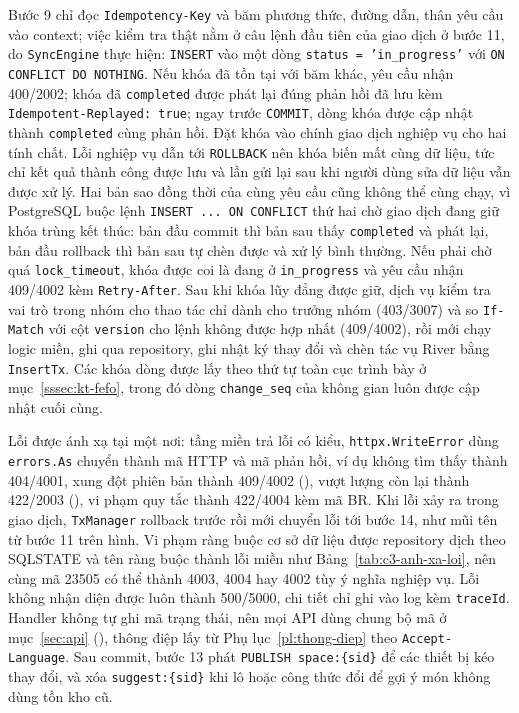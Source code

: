 Bước 9 chỉ đọc \texttt{Idempotency-Key} và băm phương thức, đường dẫn, thân yêu cầu vào context; việc kiểm tra thật nằm ở câu lệnh đầu tiên của giao dịch ở bước 11, do \texttt{SyncEngine} thực hiện: \texttt{INSERT} vào  một dòng \texttt{status = 'in\_progress'} với \texttt{ON CONFLICT DO NOTHING}. Nếu khóa đã tồn tại với băm khác, yêu cầu nhận 400/2002; khóa đã \texttt{completed} được phát lại đúng phản hồi đã lưu kèm \texttt{Idempotent-Replayed: true}; ngay trước \texttt{COMMIT}, dòng khóa được cập nhật thành \texttt{completed} cùng phản hồi. Đặt khóa vào chính giao dịch nghiệp vụ cho hai tính chất. Lỗi nghiệp vụ dẫn tới \texttt{ROLLBACK} nên khóa biến mất cùng dữ liệu, tức chỉ kết quả thành công được lưu và lần gửi lại sau khi người dùng sửa dữ liệu vẫn được xử lý. Hai bản sao đồng thời của cùng yêu cầu cũng không thể cùng chạy, vì PostgreSQL buộc lệnh \texttt{INSERT ... ON CONFLICT} thứ hai chờ giao dịch đang giữ khóa trùng kết thúc: bản đầu commit thì bản sau thấy \texttt{completed} và phát lại, bản đầu rollback thì bản sau tự chèn được và xử lý bình thường. Nếu phải chờ quá \texttt{lock\_timeout}, khóa được coi là đang ở \texttt{in\_progress} và yêu cầu nhận 409/4002 kèm \texttt{Retry-After}. Sau khi khóa lũy đẳng được giữ, dịch vụ kiểm tra vai trò trong nhóm cho thao tác chỉ dành cho trưởng nhóm (403/3007) và so \texttt{If-Match} với cột \texttt{version} cho lệnh không được hợp nhất (409/4002), rồi mới chạy logic miền, ghi qua repository, ghi nhật ký thay đổi và chèn tác vụ River bằng \texttt{InsertTx}. Các khóa dòng được lấy theo thứ tự toàn cục trình bày ở mục~\ref{sssec:kt-fefo}, trong đó dòng \texttt{change\_seq} của không gian luôn được cập nhật cuối cùng.

Lỗi được ánh xạ tại một nơi: tầng miền trả lỗi có kiểu, \texttt{httpx.WriteError} dùng \texttt{errors.As} chuyển thành mã HTTP và mã phản hồi, ví dụ không tìm thấy thành 404/4001, xung đột phiên bản thành 409/4002 (), vượt lượng còn lại thành 422/2003 (), vi phạm quy tắc thành 422/4004 kèm mã BR. Khi lỗi xảy ra trong giao dịch, \texttt{TxManager} rollback trước rồi mới chuyển lỗi tới bước 14, như mũi tên từ bước 11 trên hình. Vi phạm ràng buộc cơ sở dữ liệu được repository dịch theo SQLSTATE và tên ràng buộc thành lỗi miền như Bảng~\ref{tab:c3-anh-xa-loi}, nên cùng mã 23505 có thể thành 4003, 4004 hay 4002 tùy ý nghĩa nghiệp vụ. Lỗi không nhận diện được luôn thành 500/5000, chi tiết chỉ ghi vào log kèm \texttt{traceId}. Handler không tự ghi mã trạng thái, nên mọi API dùng chung bộ mã ở mục~\ref{sec:api} (), thông điệp lấy từ Phụ lục~\ref{pl:thong-diep} theo \texttt{Accept-Language}. Sau commit, bước 13 phát \texttt{PUBLISH space:\{sid\}} để các thiết bị kéo thay đổi, và xóa \texttt{suggest:\{sid\}} khi lô hoặc công thức đổi để gợi ý món không dùng tồn kho cũ.


